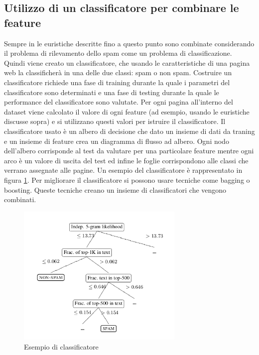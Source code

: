 \subsection{Utilizzo di un classificatore per combinare le feature}
Sempre in \cite{Ntoulas:2006:DSW:1135777.1135794} le euristiche descritte fino a questo punto sono combinate considerando il problema di rilevamento dello spam come un problema di classificazione. Quindi  viene creato un classificatore, che usando le caratteristiche di una  pagina web la classificherà in una delle due classi: spam o non spam. Costruire un classificatore richiede una fase di training durante la quale i parametri del classificatore sono determinati e una fase di testing durante la quale le performance del classificatore sono valutate. Per ogni pagina all'interno del dataset viene calcolato il valore di ogni feature (ad esempio, usando le euristiche discusse sopra) e si utilizzano questi valori per istruire il classificatore. Il classificatore usato è un albero di decisione che dato un insieme di dati da traning e un insieme di feature crea un diagramma di flusso ad albero. Ogni nodo dell'albero corrisponde al test da valutare per una particolare feature mentre ogni arco è un valore di uscita 
del test 
ed 
infine le foglie corrispondono alle classi che verrano assegnate alle pagine. Un esempio del classificatore è rappresentato in figura \ref{fig:fetterly13}. Per migliorare il classificatore si possono usare tecniche come bagging o boosting. Queste tecniche creano un insieme di classificatori  che vengono combinati.
\begin{figure}[htbp]
\centering
\includegraphics[width=8cm]{immagini/fetterly/fetterly13}
\caption{Esempio di classificatore}
\label{fig:fetterly13}
\end{figure}


